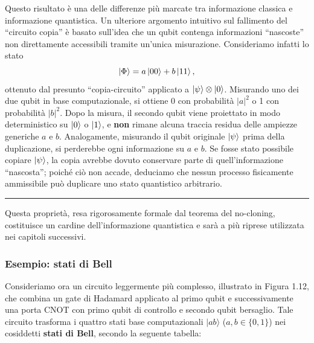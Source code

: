 \documentclass[a4paper,12pt]{report}
\theoremstyle{plain}
\begin{document}
\noindent Questo risultato è una delle differenze più marcate tra informazione classica e informazione quantistica.
Un ulteriore argomento intuitivo sul fallimento del ``circuito copia'' è basato sull'idea che un qubit contenga informazioni ``nascoste'' non direttamente accessibili tramite un'unica misurazione. Consideriamo infatti lo stato
\[
\ket{\Phi} = a\ket{00} + b\ket{11},
\]
ottenuto dal presunto ``copia-circuito'' applicato a $\ket{\psi}\otimes\ket{0}$. Misurando uno dei due qubit in base computazionale, si ottiene 0 con probabilità $\lvert a\rvert^2$ o 1 con probabilità $\lvert b\rvert^2$. Dopo la misura, il secondo qubit viene proiettato in modo deterministico su $\ket{0}$ o $\ket{1}$, e \textbf{non} rimane alcuna traccia residua delle ampiezze generiche $a$ e $b$. Analogamente, misurando il qubit originale $\ket{\psi}$ prima della duplicazione, si perderebbe ogni informazione su $a$ e $b$. Se fosse stato possibile copiare $\ket{\psi}$, la copia avrebbe dovuto conservare parte di quell'informazione ``nascosta''; poiché ciò non accade, deduciamo che nessun processo fisicamente ammissibile può duplicare uno stato quantistico arbitrario.
\vspace{1em}
\noindent\rule{\textwidth}{0.4pt}
\vspace{1em}
Questa proprietà, resa rigorosamente formale dal teorema del no-cloning, costituisce un cardine dell'informazione quantistica e sarà a più riprese utilizzata nei capitoli successivi.

\subsubsection{Esempio: stati di Bell}
Consideriamo ora un circuito leggermente più complesso, illustrato in Figura 1.12, che combina un gate di Hadamard applicato al primo qubit e successivamente una porta CNOT con primo qubit di controllo e secondo qubit bersaglio. Tale circuito trasforma i quattro stati base computazionali $\lvert ab\rangle$ ($a,b\in\{0,1\}$) nei cosiddetti \textbf{stati di Bell}, secondo la seguente tabella:
\end{document}
